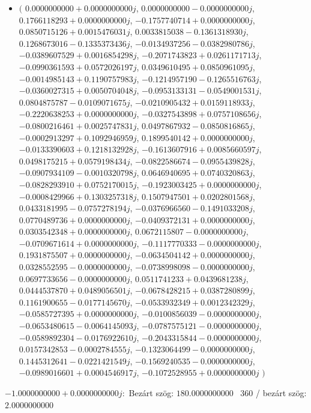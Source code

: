 \documentclass[14pt,a4paper]{article}
\begin{document}
\begin{itemize}
\item
$\big($
$0.0000000000+0.0000000000j$, $0.0000000000-0.0000000000j$, $0.1766118293+0.0000000000j$, $-0.1757740714+0.0000000000j$, $0.0850715126+0.0015476031j$, $0.0033815038-0.1361318930j$, $0.1268673016-0.1335373436j$, $-0.0134937256-0.0382980786j$, $-0.0389607529+0.0016854298j$, $-0.2071743823+0.0261171713j$, $-0.0990361593+0.0572026197j$, $0.0349610495+0.0850961095j$, $-0.0014985143+0.1190757983j$, $-0.1214957190-0.1265516763j$, $-0.0360027315+0.0050704048j$, $-0.0953133131-0.0549001531j$, $0.0804875787-0.0109071675j$, $-0.0210905432+0.0159118933j$, $-0.2220638253+0.0000000000j$, $-0.0327543898+0.0757108656j$, $-0.0800216461+0.0025747831j$, $0.0497867932-0.0850816865j$, $-0.0002913297+0.1092946959j$, $0.1899540142+0.0000000000j$, $-0.0133390603+0.1218132928j$, $-0.1613607916+0.0085660597j$, $0.0498175215+0.0579198434j$, $-0.0822586674-0.0955439828j$, $-0.0907934109-0.0010320798j$, $0.0646940695+0.0740320863j$, $-0.0828293910+0.0752170015j$, $-0.1923003425+0.0000000000j$, $-0.0008429966+0.1303257318j$, $0.1507947501+0.0202801568j$, $0.0433181995-0.0757278194j$, $-0.0376966560-0.1491033208j$, $0.0770489736+0.0000000000j$, $-0.0409372131+0.0000000000j$, $0.0303542348+0.0000000000j$, $0.0672115807-0.0000000000j$, $-0.0709671614+0.0000000000j$, $-0.1117770333-0.0000000000j$, $0.1931875507+0.0000000000j$, $-0.0634504142+0.0000000000j$, $0.0328552595-0.0000000000j$, $-0.0738998098-0.0000000000j$, $0.0697733656-0.0000000000j$, $0.0511741233+0.0439681238j$, $0.0444537870+0.0489056501j$, $-0.0678428215+0.0387280899j$, $0.1161900655-0.0177145670j$, $-0.0533932349+0.0012342329j$, $-0.0585727395+0.0000000000j$, $-0.0100856039-0.0000000000j$, $-0.0653480615-0.0064145093j$, $-0.0787575121-0.0000000000j$, $-0.0589892304-0.0176922610j$, $-0.2043315844-0.0000000000j$, $0.0157342853-0.0002784555j$, $-0.1323064499-0.0000000000j$, $0.1445312641-0.0221421549j$, $-0.1569240535-0.0000000000j$, $-0.0989016601+0.0004546917j$, $-0.1072528955+0.0000000000j$
$\big)$
\end{itemize}
$-1.0000000000+0.0000000000j$:\
Bezárt szög: $180.0000000000$ \
360 / bezárt szög: $2.0000000000$\
\end{document}
